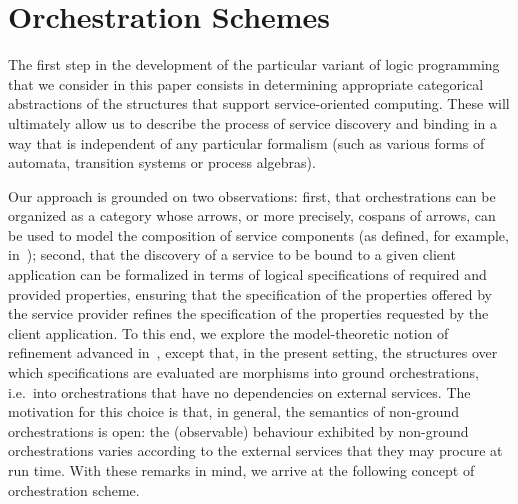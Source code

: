 \documentclass{LMCS}
\begin{document}
\section{Orchestration Schemes}
\label{section:orchestration-schemes}

The first step in the development of the particular variant of logic programming that we consider in this paper consists in determining appropriate categorical abstractions of the structures that support service-oriented computing.  These will ultimately allow us to describe the process of service discovery and binding in a way that is independent of any particular formalism (such as various forms of automata, transition systems or process algebras).

Our approach is grounded on two observations: first, that orchestrations can be organized as a category whose arrows, or more precisely, cospans of arrows, can be used to model the composition of service components (as defined, for example, in~\cite{Fiadeiro-Lopes-Bocchi:Algebraic-semantics-of-service-component-modules-2007,Fiadeiro-Lopes-Bocchi:An-abstract-model-for-service-discovery-and-binding-2011,Fiadeiro-Lopes:Dynamic-reconfiguration-in-service-oriented-architectures-2013}); second, that the discovery of a service to be bound to a given client application can be formalized in terms of logical specifications of required and provided properties, ensuring that the specification of the properties offered by the service provider refines the specification of the properties requested by the client application. To this end, we explore the model-theoretic notion of refinement advanced in~\cite{Sannella-Tarlecki:Formal-development-of-programs-from-algebraic-specifications-1988}, except  that, in the present setting, the structures over which specifications are evaluated are morphisms into ground orchestrations, i.e.\ into orchestrations that have no dependencies on external services. The motivation for this choice is that, in general, the semantics of non-ground orchestrations is open: the (observable) behaviour exhibited by non-ground orchestrations varies according to the external services that they may procure at run time.
With these remarks in mind, we arrive at the following concept of orchestration scheme.
\end{document}
